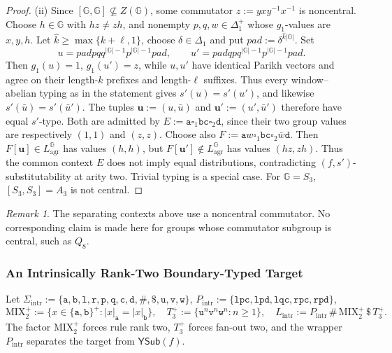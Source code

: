 \documentclass[11pt]{article}
\numberwithin{equation}{section}
\theoremstyle{plain}
\theoremstyle{definition}
\theoremstyle{remark}
\newtheorem{remark}[theorem]{Remark}
\newcommand{\blank}{\square}
\newcommand{\YSub}[1]{\mathsf{YSub}(#1)}
\theoremstyle{plain}
\begin{document}
\begin{proof}
(ii) Since $[{\mathbb G},{\mathbb G}]\not\subseteq Z({\mathbb G})$, some commutator
$z:=yx y^{-1}x^{-1}$ is noncentral.  Choose $h\in {\mathbb G}$ with $hz\ne zh$,
and nonempty $p,q,w\in\Delta_1^+$ whose $g_1$-values are $x,y,h$.
Let $\hat k\ge\max\{k+\ell,1\}$, choose
$\delta\in\Delta_1$ and put $\mathit{pad}:=\delta^{\hat k|{\mathbb G}|}$.
Set
\[
 u=\mathit{pad} p q q^{|{\mathbb G}|-1}p^{|{\mathbb G}|-1}\mathit{pad},\qquad
 u'=\mathit{pad} q p q^{|{\mathbb G}|-1}p^{|{\mathbb G}|-1}\mathit{pad}.
\]
Then $g_1(u)=1$, $g_1(u')=z$, while $u,u'$ have identical Parikh
vectors and agree on their length-$k$ prefixes and length-$\ell$
suffixes.  Thus every window--abelian typing as in the statement
gives $s'(u)=s'(u')$, and likewise $s'(\bar u)=s'(\bar u')$.
The tuples $\mathbf u:=(u,\bar u)$ and $\mathbf u':=(u',\bar u')$ therefore have equal
$s'$-type.  Both are admitted by
$E:=\mathtt a\blank_1\mathtt{bc}\blank_2\mathtt d$,
since their two group values are respectively $(1,1)$ and $(z,z)$.
Choose also
$F:=\mathtt a w\blank_1\mathtt{bc}\blank_2\bar w\mathtt d$.
Then $F[\mathbf u]\in L_{\mathrm{agr}}^{\mathbb G}$ has values $(h,h)$, but
$F[\mathbf u']\notin L_{\mathrm{agr}}^{\mathbb G}$ has values $(hz,zh)$.
Thus the common context $E$ does not imply equal distributions,
contradicting $(f,s')$-substitutability at arity two.  Trivial typing
is a special case.  For ${\mathbb G}=S_3$, $[S_3,S_3]=A_3$ is not central.
\end{proof}

\begin{remark}
The separating contexts above use a noncentral commutator.
No corresponding claim is made here for groups whose commutator
subgroup is central, such as $Q_8$.
\end{remark}

\subsubsection{An Intrinsically Rank-Two Boundary-Typed Target}
\label{subsec:intrinsic-ranktwo}

Let $\Sigma_{\mathrm{intr}}:=\{\mathtt a,\mathtt b,\mathtt l,\mathtt r,\mathtt p,\mathtt q,
\mathtt c,\mathtt d,\mathtt\#,\mathtt\$,\mathtt u,\mathtt v,\mathtt w\}$,
$P_{\mathrm{intr}}:=\{\mathtt{lpc},\mathtt{lpd},\mathtt{lqc},\mathtt{rpc},\mathtt{rpd}\}$,
\[
 \mathrm{MIX}_2^+:=\{x\in\{\mathtt a,\mathtt b\}^+:|x|_{\mathtt a}=|x|_{\mathtt b}\},\quad
 T_3^+:=\{\mathtt u^n\mathtt v^n\mathtt w^n:n\ge1\},\quad
 L_{\mathrm{intr}}:=P_{\mathrm{intr}}\,\mathtt\#\,\mathrm{MIX}_2^+\,\mathtt\$\,T_3^+ .
\]
The factor $\mathrm{MIX}_2^+$ forces rule rank two, $T_3^+$ forces fan-out two, and the
wrapper $P_{\mathrm{intr}}$ separates the target from $\YSub{f}$.
\end{document}
